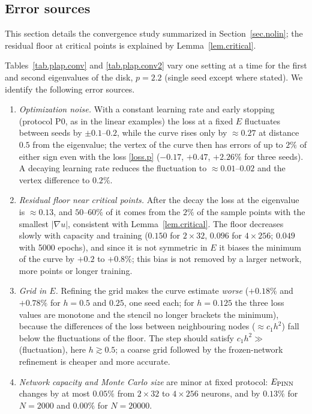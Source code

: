 \documentclass[10pt]{amsart}
\theoremstyle{definition}
\theoremstyle{remark}
\theoremstyle{plain}
\begin{document}
\subsection{Error sources}\label{app.conv}
This section details the convergence study summarized in Section~\ref{sec.nolin}; the residual floor at critical points is explained by Lemma~\ref{lem.critical}.


Tables~\ref{tab.plap.conv} and \ref{tab.plap.conv2} vary one setting at a time for the first and second
eigenvalues of the disk, $p=2.2$ (single seed except where stated). We identify the following error
sources.
\begin{enumerate}
\item \emph{Optimization noise.} With a constant learning rate and early stopping (protocol P0, as in
the linear examples) the loss at a fixed $E$ fluctuates between seeds by $\pm0.1$--$0.2$, while the
curve rises only by $\approx0.27$ at distance $0.5$ from the eigenvalue; the vertex of the curve then
has errors of up to $2\%$ of either sign even with the loss \eqref{loss.p} ($-0.17$, $+0.47$, $+2.26\%$
for three seeds). A decaying learning rate reduces the
fluctuation to $\approx0.01$--$0.02$ and the vertex difference to $0.2\%$.
\item \emph{Residual floor near critical points.} After the decay the loss at the eigenvalue is
$\approx0.13$, and $50$--$60\%$ of it comes from the $2\%$ of the sample points with the smallest
$|\nabla u|$, consistent with Lemma~\ref{lem.critical}. The floor decreases slowly with capacity and
training ($0.150$ for $2\times32$, $0.096$ for $4\times256$; $0.049$ with 5000 epochs), and since it
is not symmetric in $E$ it biases the minimum of the curve by $+0.2$ to $+0.8\%$; this bias is not
removed by a larger network, more points or longer training.
\item \emph{Grid in $E$.} Refining the grid makes the curve estimate \emph{worse}
($+0.18\%$ and $+0.78\%$ for $h=0.5$ and $0.25$, one seed each; for $h=0.125$ the three loss values
are monotone and the stencil no longer brackets the minimum), because the differences of the loss
between neighbouring nodes ($\approx c_1h^2$) fall below the fluctuations of the floor. The step should
satisfy $c_1h^2\gg$ (fluctuation), here $h\gtrsim0.5$; a coarse grid followed by the frozen-network
refinement is cheaper and more accurate.
\item \emph{Network capacity and Monte Carlo size} are minor at fixed protocol: $E_{\rm PINN}$ changes
by at most $0.05\%$ from $2\times32$ to $4\times256$ neurons, and by $0.13\%$ for $N=2000$ and $0.00\%$
for $N=20000$.
\end{enumerate}
\end{document}
